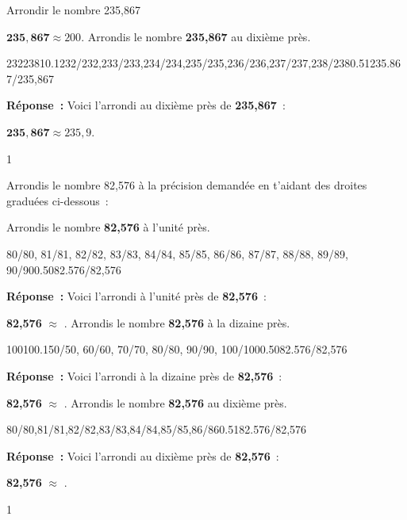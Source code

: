 \documentclass[a4paper,11pt]{report}
\begin{document}
\begin{resolu}{Arrondir le nombre 235,867}
{\begin{tasks}
$\bm{235,867 } \approx 200.$
\task Arrondis le nombre {\bf 235,867} au dixième près.
\begin{center}
\begin{numberlined}{232}{238}{1}{0.1}{232/232,233/233,234/234,235/235,236/236,237/237,238/238}{0.5}{1}{235.867/{235,867}}\end{numberlined}
\end{center}
{\bf Réponse~:} Voici l'arrondi au dixième près de {\bf 235,867}~: 

$\bm{235,867 } \approx 235,9.$
\end{tasks}
}{1}
\end{resolu}


\begin{exop}{
Arrondis le nombre 82,576 à la précision demandée en t'aidant des droites graduées ci-dessous~: 
\begin{tasks}
\task Arrondis le nombre {\bf 82,576} à l'unité près.
\begin{center}
\begin{numberlined}{80}{90}{1}{0.1}{80/80, 81/81, 82/82, 83/83, 84/84, 85/85, 86/86, 87/87, 88/88, 89/89, 90/90}{0.5}{0}{82.576/{82,576}}\end{numberlined}
\end{center}
{\bf Réponse~:} Voici l'arrondi à l'unité près de {\bf 82,576}~: 

{\bf 82,576} $\approx$ \makebox[.8in]{\hrulefill} .
\task Arrondis le nombre {\bf 82,576} à la dizaine près.
\begin{center}
\begin{numberlined}{50}{100}{10}{0.1}{50/50, 60/60, 70/70, 80/80, 90/90, 100/100}{0.5}{0}{82.576/{82,576}}\end{numberlined}
\end{center}
{\bf Réponse~:} Voici l'arrondi à la dizaine près de {\bf 82,576}~: 

{\bf 82,576} $\approx$ \makebox[.8in]{\hrulefill} .
\task Arrondis le nombre {\bf 82,576} au dixième près.
\begin{center}
\begin{numberlined}{80}{86}{1}{0.1}{80/80,81/81,82/82,83/83,84/84,85/85,86/86}{0.5}{1}{82.576/{82,576}}\end{numberlined}
\end{center}

{\bf Réponse~:} Voici l'arrondi au dixième près de {\bf 82,576}~: 

{\bf 82,576} $\approx$ \makebox[.8in]{\hrulefill} .
\end{tasks}
}{1}
\end{exop}
\end{document}
